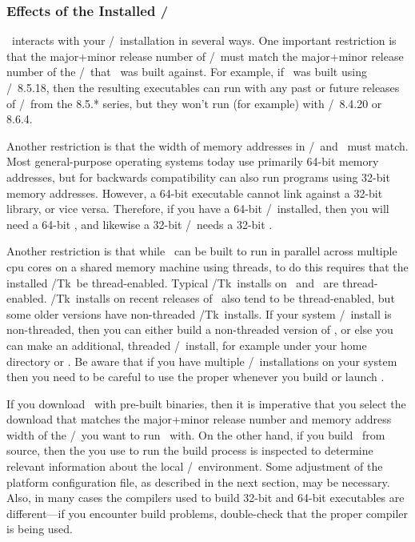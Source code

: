 \subsubsection{Effects of the Installed \Tcl/\Tk}
\OOMMF\ interacts with your \Tcl/\Tk\ installation in several ways.  One
important restriction is that the major+minor release number of
\Tcl/\Tk\ must match the major+minor release number of the \Tcl/\Tk\
that \OOMMF\ was built against.  For example, if \OOMMF\ was built using
\Tcl/\Tk\ 8.5.18, then the resulting executables can run with any past or
future releases of \Tcl/\Tk\ from the 8.5.* series, but they won't run
(for example) with \Tcl/\Tk\ 8.4.20 or 8.6.4.

Another restriction is that the width of memory addresses in \Tcl/\Tk\
and \OOMMF\ must match.  Most general-purpose operating systems today
use primarily 64-bit memory addresses, but for backwards compatibility
can also run programs using 32-bit memory addresses.  However, a 64-bit
executable cannot link against a 32-bit library, or vice versa.
Therefore, if you have a 64-bit \Tcl/\Tk\ installed, then you will need
a 64-bit \OOMMF, and likewise a 32-bit \Tcl/\Tk\ needs a 32-bit \OOMMF.

Another restriction is that while \OOMMF\ can be built to run in
parallel across multiple cpu cores on a shared memory machine using
threads, to do this requires that the installed \Tcl/Tk\ be
thread-enabled.  Typical \Tcl/Tk\ installs on \Windows\ and \MacOSX\ are
thread-enabled.  \Tcl/Tk\ installs on recent releases of \Unix\ also
tend to be thread-enabled, but some older versions have non-threaded
\Tcl/Tk\ installs.  If your system \Tcl/\Tk\ install is non-threaded,
then you can either build a non-threaded version of \OOMMF, or else you
can make an additional, threaded \Tcl/\Tk\ install, for example under
your home directory or \fn{/usr/local}.  Be aware that if you have
multiple \Tcl/\Tk\ installations on your system then you need to be
careful to use the proper \fn{tclsh} whenever you build or launch
\OOMMF.

If you download \OOMMF\ with pre-built binaries, then it is imperative
that you select the download that matches the major+minor release
number and memory address width of the \Tcl/\Tk\ you want to run
\OOMMF\ with.  On the other hand, if you build \OOMMF\ from source,
then the \fn{tclsh} you use to run the build process is inspected to
determine relevant information about the local \Tcl/\Tk\ environment.
Some adjustment of the platform
configuration file, as described in the next section, may be
necessary.  Also, in many cases the compilers used to build 32-bit and
64-bit executables are different---if you encounter build problems,
double-check that the proper compiler is being used.

